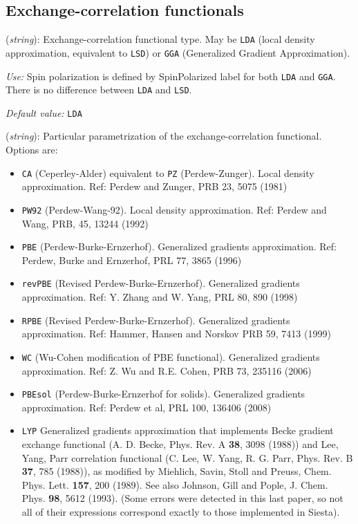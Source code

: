 \documentclass[11pt]{article}
\begin{document}
\vspace{5pt}
\subsection{Exchange-correlation functionals}

\begin{description}
\itemsep 10pt
\parsep 0pt

\item[{\bf XC.functional}] ({\it string}):
Exchange-correlation functional type. May be {\tt LDA}
(local density approximation, equivalent to {\tt LSD}) or
{\tt GGA} (Generalized Gradient Approximation).

{\it Use:} Spin polarization is defined by SpinPolarized label for
both {\tt LDA} and {\tt GGA}. There is no difference between {\tt LDA}
and {\tt LSD}.

{\it Default value:} {\tt LDA}


\item[{\bf XC.authors}] ({\it string}):
Particular parametrization of the
exchange-correlation functional. Options are:
\begin{itemize}
\item {\tt CA} (Ceperley-Alder) 
equivalent to {\tt PZ} (Perdew-Zunger). 
Local density approximation.
Ref: Perdew and Zunger, PRB 23, 5075 (1981)
\item {\tt PW92} (Perdew-Wang-92). 
Local density approximation.
Ref: Perdew and Wang, PRB, 45, 13244 (1992)
\item {\tt PBE} (Perdew-Burke-Ernzerhof). Generalized gradients
approximation.  Ref: Perdew, Burke and Ernzerhof, PRL 77, 3865
(1996) 
\item {\tt revPBE} (Revised Perdew-Burke-Ernzerhof). Generalized gradients
approximation.  Ref: Y. Zhang and W. Yang, PRL 80, 890
(1998) 
\item {\tt RPBE} (Revised Perdew-Burke-Ernzerhof). Generalized gradients
approximation.  Ref: Hammer, Hansen and Norskov PRB 59, 7413
(1999) 
\item {\tt WC} (Wu-Cohen modification of PBE functional). Generalized gradients
approximation.  Ref: Z. Wu and R.E. Cohen, PRB 73, 235116 (2006)
 
\item {\tt PBEsol} (Perdew-Burke-Ernzerhof for solids). Generalized gradients
approximation.  Ref: Perdew et al, PRL 100, 136406
(2008) 
\item {\tt LYP} Generalized gradients approximation 
that implements Becke gradient exchange functional (A. D.
Becke, Phys. Rev. A {\bf 38}, 3098 (1988)) and Lee, Yang, Parr
correlation functional (C. Lee, W. Yang, R. G. Parr, Phys. Rev. B
{\bf 37}, 785 (1988)), as modified by Miehlich, Savin, Stoll and Preuss,
Chem. Phys. Lett. {\bf 157}, 200 (1989). See also Johnson, Gill and Pople,
J. Chem. Phys. {\bf 98}, 5612 (1993). (Some errors were detected in this
last paper, so not all of their expressions correspond exactly to those
implemented in {\sc Siesta}).


\end{itemize}
\end{description}
\end{document}
